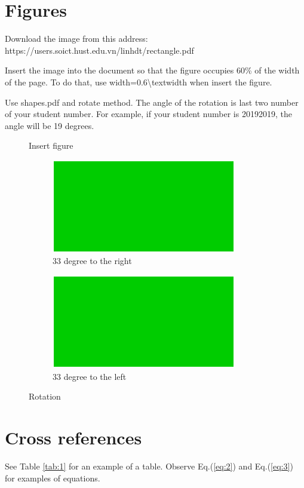 \documentclass{article}
\begin{document}
	\section{Figures}
		Download the image from this address:\\
		https://users.soict.hust.edu.vn/linhdt/rectangle.pdf
		
		Insert the image into the document so that the figure occupies 60\% of the
width of the page. To do that, use width=0.6\textbackslash{textwidth} when insert the figure.

		Use shapes.pdf and rotate method. The angle of the rotation is last two number of your student number. For example, if your student number is 20192019,
the angle will be 19 degrees.

	\begin{figure}[tbh]
	\caption{Insert figure}
	\end{figure}
	
	\begin{figure}[tbh]
	\centering
		\begin{subfigure}[tbh]{0.4\textwidth}
			\centering
			\includegraphics[angle=33]{rectangle}
			\caption{33 degree to the right}
		\end{subfigure}
		\hfill
		\begin{subfigure}[tbh]{0.4\textwidth}
			\centering
			\includegraphics[angle=327]{rectangle}
			\caption{33 degree to the left}
		\end{subfigure}
	\caption{Rotation}
	\end{figure}

\section{Cross references}
	See Table \ref{tab:1} for an example of a table. Observe Eq.(\ref{eq:2}) and Eq.(\ref{eq:3}) for examples of equations.
\tableofcontents
\listoffigures
\listoftables
\end{document}
